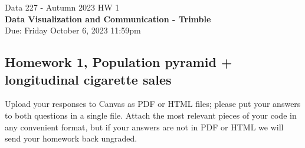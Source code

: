 \documentclass[]{book}
\theoremstyle{definition}
\begin{document}
\begin{center}
{\Large Data 227 - Autumn 2023 \hspace{0.5cm} HW 1}\\
\textbf{Data Visualization and Communication - Trimble}\\ %
Due: Friday October 6, 2023  11:59pm 
\end{center}

\vspace{0.2 cm}


\subsection*{Homework 1, Population pyramid + longitudinal cigarette sales}

Upload your responses to Canvas as PDF or HTML files; please put your answers to both questions in a single file.  Attach the most relevant pieces of your code in any convenient format, but if your answers are not in PDF or HTML we will send your homework back ungraded.
\end{document}
